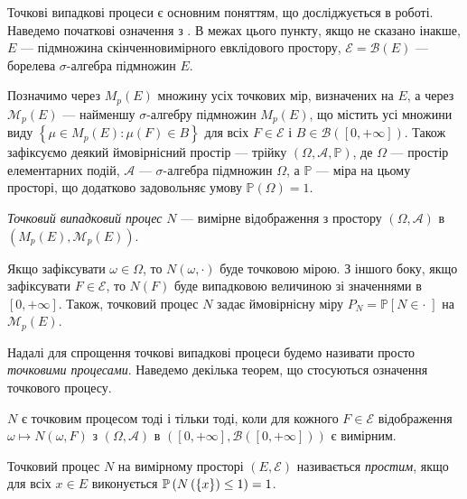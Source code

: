 Точкові випадкові процеси є основним поняттям, що досліджується в роботі.
Наведемо початкові означення з \cite{Resnick_1987}.
В межах цього пункту, якщо не сказано інакше,
$E$ --- підмножина скінченновимірного евклідового простору,
$\mathcal{E} = \mathcal{B}(E)$ --- борелева $\sigma$-алгебра підмножин $E$.

Позначимо через $M_p(E)$ множину усіх точкових мір, визначених на $E$,
а через $\mathcal{M}_p(E)$ --- найменшу $\sigma$-алгебру
підмножин $M_p(E)$, що містить усі множини виду
$\left\{
    \mu \in M_p(E) : \mu(F) \in B
\right\}$ для всіх $F \in \mathcal{E}$ і $B \in \mathcal{B}\left([0, +\infty]\right)$.
Також зафіксуємо деякий ймовірнісний простір --- трійку
$\left(\Omega, \mathcal{A}, \mathbb{P}\right)$, де
$\Omega$ --- простір елементарних подій, $\mathcal{A}$ ---
$\sigma$-алгебра підмножин $\Omega$, а $\mathbb{P}$ --- міра на цьому просторі,
що додатково задовольняє умову $\mathbb{P}\left(\Omega\right) = 1$.
\begin{definition} 
    \emph{Точковий випадковий процес} $N$ --- вимірне відображення
    з простору $\left(\Omega, \mathcal{A}\right)$
    в $\left(M_p(E), \mathcal{M}_p(E)\right)$.
\end{definition}
Якщо зафіксувати $\omega \in \Omega$, то $N(\omega, \cdot)$
буде точковою мірою. З іншого боку, якщо зафіксувати $F \in \mathcal{E}$,
то $N(F)$ буде випадковою величиною зі значеннями в $[0, +\infty]$.
Також, точковий процес $N$ задає ймовірнісну міру 
$P_N = \mathbb{P}\left[N \in \cdot \; \right]$
на $\mathcal{M}_p(E)$.

Надалі для спрощення точкові випадкові процеси
будемо називати просто \emph{точковими процесами}. Наведемо
декілька теорем, що стосуються означення точкового процесу.

\begin{theorem}
    $N$ є точковим процесом тоді і тільки тоді, коли для кожного
    $F \in \mathcal{E}$
    відображення $\omega \mapsto N(\omega, F)$
    з $\left(\Omega, \mathcal{A}\right)$
    в $\left([0, +\infty], \mathcal{B}([0, +\infty])\right)$
    є вимірним.
\end{theorem}

\begin{definition}
    Точковий процес $N$ на вимірному просторі
    $\left(E, \mathcal{E}\right)$ називається \emph{простим}, якщо 
    для всіх $x \in E$ виконується $\P{N\left(\{ x \}\right) \leq 1} = 1$.
\end{definition}

